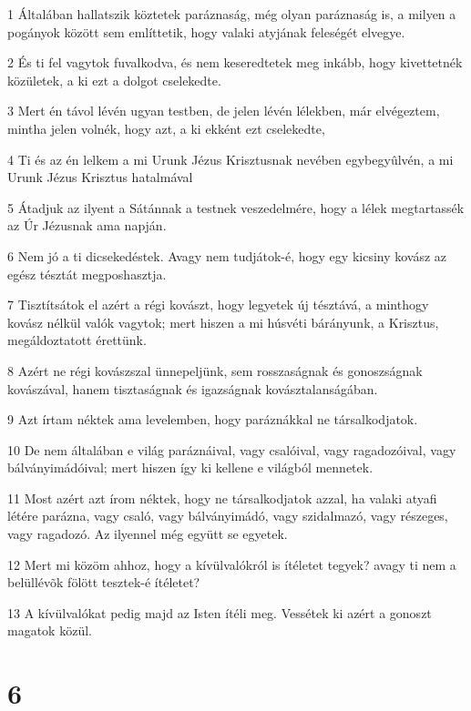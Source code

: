 \par 1 Általában hallatszik köztetek paráznaság, még olyan paráznaság is, a milyen a pogányok között sem említtetik, hogy valaki atyjának feleségét elvegye.
\par 2 És ti fel vagytok fuvalkodva, és nem keseredtetek meg inkább, hogy kivettetnék közületek, a ki ezt a dolgot cselekedte.
\par 3 Mert én távol lévén ugyan testben, de jelen lévén lélekben, már elvégeztem, mintha jelen volnék, hogy azt, a ki ekként ezt cselekedte,
\par 4 Ti és az én lelkem a mi Urunk Jézus Krisztusnak nevében egybegyûlvén, a mi Urunk Jézus Krisztus hatalmával
\par 5 Átadjuk az ilyent a Sátánnak a testnek veszedelmére, hogy a lélek megtartassék az Úr Jézusnak ama napján.
\par 6 Nem jó a ti dicsekedéstek. Avagy nem tudjátok-é, hogy egy kicsiny kovász az egész tésztát megposhasztja.
\par 7 Tisztítsátok el azért a régi kovászt, hogy legyetek új tésztává, a minthogy kovász nélkül valók vagytok; mert hiszen a mi húsvéti bárányunk, a Krisztus, megáldoztatott érettünk.
\par 8 Azért ne régi kovászszal ünnepeljünk, sem rosszaságnak és gonoszságnak kovászával, hanem tisztaságnak és igazságnak kovásztalanságában.
\par 9 Azt írtam néktek ama levelemben, hogy paráznákkal ne társalkodjatok.
\par 10 De nem általában e világ paráznáival, vagy csalóival, vagy ragadozóival, vagy bálványimádóival; mert hiszen így ki kellene e világból mennetek.
\par 11 Most azért azt írom néktek, hogy ne társalkodjatok azzal, ha valaki atyafi létére parázna, vagy csaló, vagy bálványimádó, vagy szidalmazó, vagy részeges, vagy ragadozó. Az ilyennel még együtt se egyetek.
\par 12 Mert mi közöm ahhoz, hogy a kívülvalókról is ítéletet tegyek? avagy ti nem a belüllévõk fölött tesztek-é ítéletet?
\par 13 A kívülvalókat pedig majd az Isten ítéli meg. Vessétek ki azért a gonoszt magatok közül.

\chapter{6}

